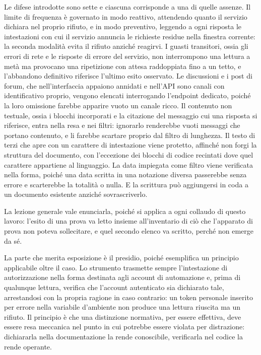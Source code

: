 Le difese introdotte sono sette e ciascuna corrisponde a una di quelle assenze. Il limite di frequenza è governato in modo reattivo, attendendo quanto il servizio dichiara nel proprio rifiuto, e in modo preventivo, leggendo a ogni risposta le intestazioni con cui il servizio annuncia le richieste residue nella finestra corrente: la seconda modalità evita il rifiuto anziché reagirvi. I guasti transitori, ossia gli errori di rete e le risposte di errore del servizio, non interrompono una lettura a metà ma provocano una ripetizione con attesa raddoppiata fino a un tetto, e l'abbandono definitivo riferisce l'ultimo esito osservato. Le discussioni e i post di forum, che nell'interfaccia appaiono annidati e nell'API sono canali con identificativo proprio, vengono elencati interrogando l'endpoint dedicato, poiché la loro omissione farebbe apparire vuoto un canale ricco. Il contenuto non testuale, ossia i blocchi incorporati e la citazione del messaggio cui una risposta si riferisce, entra nella resa e nei filtri: ignorarlo renderebbe vuoti messaggi che portano contenuto, e li farebbe scartare proprio dal filtro di lunghezza. Il testo di terzi che apre con un carattere di intestazione viene protetto, affinché non forgi la struttura del documento, con l'eccezione dei blocchi di codice recintati dove quel carattere appartiene al linguaggio. La data impiegata come filtro viene verificata nella forma, poiché una data scritta in una notazione diversa passerebbe senza errore e scarterebbe la totalità o nulla. E la scrittura può aggiungersi in coda a un documento esistente anziché sovrascriverlo.

La lezione generale vale enunciarla, poiché si applica a ogni collaudo di questo lavoro: l'esito di una prova va letto insieme all'inventario di ciò che l'apparato di prova non poteva sollecitare, e quel secondo elenco va scritto, perché non emerge da sé.

La parte che merita esposizione è il presidio, poiché esemplifica un principio applicabile oltre il caso. Lo strumento trasmette sempre l'intestazione di autorizzazione nella forma destinata agli account di automazione e, prima di qualunque lettura, verifica che l'account autenticato sia dichiarato tale, arrestandosi con la propria ragione in caso contrario: un token personale inserito per errore nella variabile d'ambiente non produce una lettura riuscita ma un rifiuto. Il principio è che una distinzione normativa, per essere effettiva, deve essere resa meccanica nel punto in cui potrebbe essere violata per distrazione: dichiararla nella documentazione la rende conoscibile, verificarla nel codice la rende operante.

